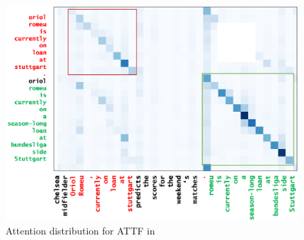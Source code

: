 \begin{figure}[th!]
\centering
\includegraphics[width=0.84\columnwidth]{map3}
\caption{Attention distribution for ATTF in }
\label{fig:attn_map3}
\end{figure}

